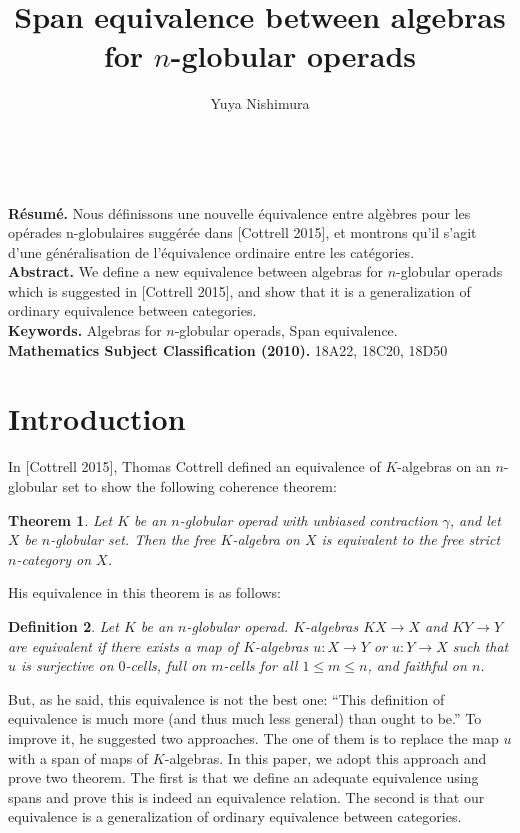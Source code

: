 \documentclass[12pt]{article}
\theoremstyle{plain}
\newtheorem{theorem}{Theorem}[section]
\newtheorem{definition}[theorem]{Definition}
\theoremstyle{definition}
\begin{document}
\title{Span equivalence between algebras for $n$-globular operads}
\author{Yuya Nishimura}
\maketitle

\newpage


\mbox{ }
\vspace{35mm}


\begin{minipage}{118mm}{\small{\bf R\'esum\'e.} Nous d\'efinissons une nouvelle \'equivalence entre alg\`ebres pour les
op\'erades n-globulaires sugg\'er\'ee dans [Cottrell 2015], et montrons qu'il s'agit d'une g\'en\'eralisation de l'\'equivalence ordinaire entre les cat\'egories.\\
{\bf Abstract.} We define a new equivalence between algebras for $n$-globular operads which is suggested in [Cottrell 2015], and show that it is a generalization of ordinary equivalence between categories.\\
{\bf Keywords.} Algebras for $n$-globular operads, Span equivalence.\\
{\bf Mathematics Subject Classification (2010).} 18A22, 18C20, 18D50
}\end{minipage}


\section{Introduction}
In [Cottrell 2015], Thomas Cottrell  defined an equivalence of $K$-algebras on an $n$-globular set to show the following coherence theorem:
\begin{theorem}
Let $K$ be an $n$-globular operad with unbiased contraction $\gamma$, and let $X$ be $n$-globular set.
Then the free $K$-algebra on $X$ is equivalent to the free strict $n$-category on $X$.
\end{theorem}
\noindent
His equivalence in this theorem is as follows:
\begin{definition}
Let $K$ be an $n$-globular operad. $K$-algebras $KX \rightarrow X$ and $KY \rightarrow Y$ are equivalent if there exists a map of $K$-algebras $u:X \rightarrow Y$ or $u:Y \rightarrow X$ such that $u$ is surjective on $0$-cells, full on $m$-cells for all $1 \leq m \leq n$, and faithful on $n$.
\end{definition}
\noindent
But, as he said, this equivalence is not the best one: ``This definition of equivalence is much more (and thus much less general) than ought to be.'' To improve it, he suggested two approaches. The one of them is to replace the map $u$ with a span of maps of $K$-algebras. In this paper, we adopt this approach and prove two theorem. The first is that we define an adequate equivalence using spans
and prove this is indeed an equivalence relation. The second is that our equivalence is a generalization of ordinary equivalence between categories.
\end{document}
